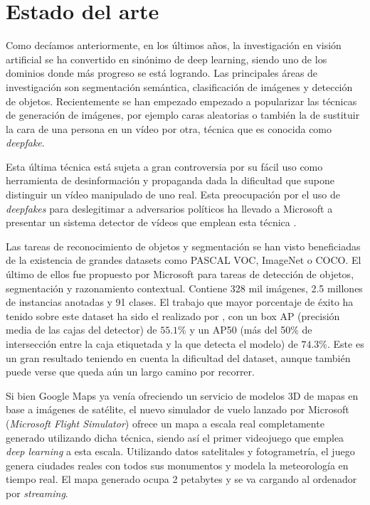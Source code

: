 \section{Estado del arte}

Como decíamos anteriormente, en los últimos años, la investigación en visión artificial se ha convertido en sinónimo de deep learning, siendo uno de los dominios donde más progreso se está logrando. Las principales áreas de investigación son segmentación semántica, clasificación de imágenes y detección de objetos. Recientemente se han empezado empezado a popularizar las técnicas de generación de imágenes, por ejemplo caras aleatorias o también la de sustituir la cara de una persona en un vídeo por otra, técnica que es conocida como \textit{deepfake}.

Esta última técnica está sujeta a gran controversia por su fácil uso como herramienta de desinformación y propaganda dada la dificultad que supone distinguir un vídeo manipulado de uno real. Esta preocupación por el uso de \textit{deepfakes} para deslegitimar a adversarios políticos ha llevado a Microsoft a presentar un sistema detector de vídeos que emplean esta técnica \cite{deepFake}.

Las tareas de reconocimiento de objetos y segmentación se han visto beneficiadas de la existencia de grandes datasets como PASCAL VOC, ImageNet o COCO. El último de ellos fue propuesto por Microsoft para tareas de detección de objetos, segmentación y razonamiento contextual. Contiene 328 mil imágenes, 2.5 millones de instancias anotadas y 91 clases. El trabajo que mayor porcentaje de éxito ha tenido sobre este dataset ha sido el realizado por \citet{Tan_2020}, con un box AP (precisión media de las cajas del detector) de $55.1\%$ y un AP50 (más del 50\% de intersección entre la caja etiquetada y la que detecta el modelo) de $74.3\%$. Este es un gran resultado teniendo en cuenta la dificultad del dataset, aunque también puede verse que queda aún un largo camino por recorrer.

Si bien Google Maps ya venía ofreciendo un servicio de modelos 3D de mapas en base a imágenes de satélite, el nuevo simulador de vuelo lanzado por Microsoft (\textit{Microsoft Flight Simulator}) ofrece un mapa a escala real completamente generado utilizando dicha técnica, siendo así el primer videojuego que emplea \textit{deep learning} a esta escala. Utilizando datos satelitales y fotogrametría, el juego genera ciudades reales con todos sus monumentos y modela la meteorología en tiempo real. El mapa generado ocupa 2 petabytes y se va cargando al ordenador por \textit{streaming}.

